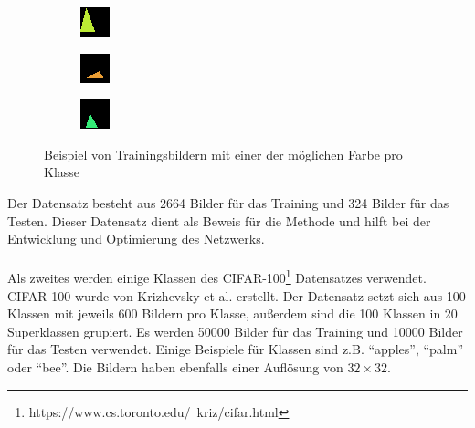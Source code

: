 \begin{figure}[H]
  \begin{subfigure}
    \centering
    \includegraphics[width=.15\textwidth]{resources/dataset/dummy/triangle41.png}
  \end{subfigure}
  \begin{subfigure}
    \centering
    \includegraphics[width=.15\textwidth]{resources/dataset/dummy/triangle49.png}
  \end{subfigure}
  \begin{subfigure}
    \centering
    \includegraphics[width=.15\textwidth]{resources/dataset/dummy/triangle51.png}
  \end{subfigure}
  \caption{Beispiel von Trainingsbildern mit einer der möglichen Farbe pro Klasse}
  \label{image:dummy}
\end{figure}

Der Datensatz besteht aus 2664 Bilder für das Training und 324 Bilder für das Testen.
Dieser Datensatz dient als Beweis für die Methode und hilft bei der Entwicklung und Optimierung des Netzwerks.
\\
\\
Als zweites werden einige Klassen des CIFAR-100\footnote{https://www.cs.toronto.edu/~kriz/cifar.html} Datensatzes verwendet. CIFAR-100 wurde von
Krizhevsky et al. erstellt. Der Datensatz setzt sich aus 100 Klassen mit jeweils 600 Bildern pro Klasse, außerdem sind die 100 Klassen
in 20 Superklassen grupiert. Es werden 50000 Bilder für das Training und 10000 Bilder für das Testen verwendet.
Einige Beispiele für Klassen sind z.B. ``apples'', ``palm'' oder ``bee''. Die Bildern haben ebenfalls einer Auflösung von $ 32 \times 32 $.

